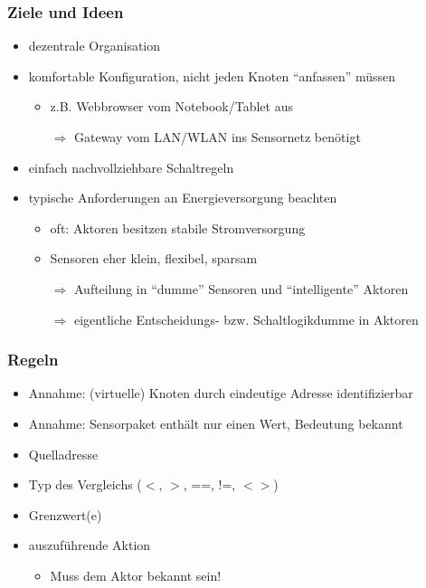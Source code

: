 \documentclass{beamer}
\newcommand{\customitemsep}{7pt}
\newcommand{\customitemsepsub}{2pt}
\begin{document}
\begin{frame}
    \frametitle{Ziele und Ideen}

    \begin{itemize} \setlength{\itemsep}{\customitemsep}
        \item dezentrale Organisation
        \item komfortable Konfiguration, nicht jeden Knoten \enquote{anfassen} müssen
            \begin{itemize} \setlength{\itemsep}{\customitemsepsub}
                \item z.B. Webbrowser vom Notebook/Tablet aus
                \item[$\Rightarrow$] Gateway vom LAN/WLAN ins Sensornetz benötigt
            \end{itemize}

        \item einfach nachvollziehbare Schaltregeln
        \item typische Anforderungen an Energieversorgung beachten
            \begin{itemize} \setlength{\itemsep}{\customitemsepsub}
                \item oft: Aktoren besitzen stabile Stromversorgung
                \item Sensoren eher klein, flexibel, sparsam
                \item[$\Rightarrow$] Aufteilung in \enquote{dumme} Sensoren und \enquote{intelligente} Aktoren
                \item[$\Rightarrow$] eigentliche Entscheidungs- bzw. Schaltlogik{dumme} in Aktoren
            \end{itemize}
    \end{itemize}
\end{frame}

\begin{frame}
    \frametitle{Regeln}

    \begin{itemize} \setlength{\itemsep}{\customitemsep}
        \item Annahme: (virtuelle) Knoten durch eindeutige Adresse identifizierbar
        \item Annahme: Sensorpaket enthält nur einen Wert, Bedeutung bekannt
        \item[ ] \vspace*{0.5cm}
            \pause
        \item Quelladresse
        \item Typ des Vergleichs ($<$, $>$, ==, !=, $<>$)
        \item Grenzwert(e)
        \item auszuführende Aktion
            \begin{itemize} \setlength{\itemsep}{\customitemsep}
                \item Muss dem Aktor bekannt sein!
            \end{itemize}
    \end{itemize}
\end{frame}
\end{document}
